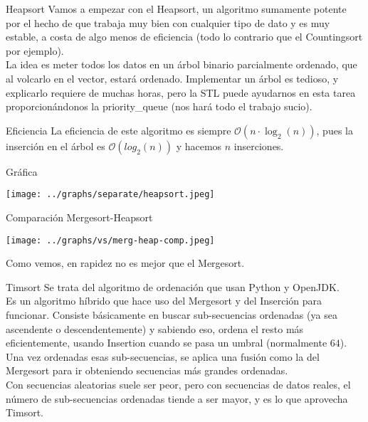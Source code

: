 \documentclass[compress]{beamer}
\begin{document}
\begin{frame}{Heapsort}
Vamos a empezar con el Heapsort, un algoritmo sumamente potente por el hecho de que trabaja muy bien con cualquier tipo de dato y es muy estable, a costa de algo menos de eficiencia (todo lo contrario que el Countingsort por ejemplo).\\
\vspace{0.20in}
La idea es meter todos los datos en un árbol binario parcialmente ordenado, que al volcarlo en el vector, estará ordenado. Implementar un árbol es tedioso, y explicarlo requiere de muchas horas, pero la STL puede ayudarnos en esta tarea proporcionándonos la priority\_queue (nos hará todo el trabajo sucio).\\
	\begin{block}{Eficiencia}
	La eficiencia de este algoritmo es siempre $\mathcal{O}(n\cdot\log_2(n))$, pues la inserción en el árbol es $\mathcal{O}(log_2(n))$ y hacemos $n$ inserciones.
	\end{block}
\end{frame}

\begin{frame}{Gráfica}
	\begin{alertblock}{}
		\begin{center}
		\texttt{[image: ../graphs/separate/heapsort.jpeg]}
		\end{center}
	\end{alertblock}
\end{frame}

\begin{frame}{Comparación Mergesort-Heapsort}
	\begin{alertblock}{}
		\begin{center}
		\texttt{[image: ../graphs/vs/merg-heap-comp.jpeg]}
		\end{center}
	\end{alertblock}
Como vemos, en rapidez no es mejor que el Mergesort.
\end{frame}

\begin{frame}{Timsort}
Se trata del algoritmo de ordenación que usan Python y OpenJDK.\\
\vspace{0.20in}
Es un algoritmo híbrido que hace uso del Mergesort y del Inserción para funcionar. Consiste básicamente en buscar sub-secuencias ordenadas (ya sea ascendente o descendentemente) y sabiendo eso, ordena el resto más eficientemente, usando Insertion cuando se pasa un umbral (normalmente $64$). Una vez ordenadas esas sub-secuencias, se aplica una fusión como la del Mergesort para ir obteniendo secuencias más grandes ordenadas.\\
\vspace{0.20in}
Con secuencias aleatorias suele ser peor, pero con secuencias de datos reales, el número de sub-secuencias ordenadas tiende a ser mayor, y es lo que aprovecha Timsort.
\end{frame}
\end{document}
